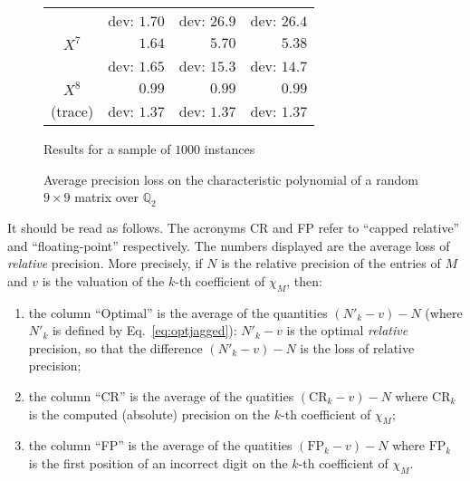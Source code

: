 \documentclass[sigconf]{acmart}
\newcommand{\Q}{\mathbb Q}
\theoremstyle{definition}
\begin{document}
\begin{figure}
{\begin{tabular}{|c|r|r|r|}
& {\scriptsize dev: $1.70$} & {\scriptsize dev: $26.9$} & {\scriptsize dev: $26.4$} \\
\rule{0pt}{2.7ex}%
$X^7$ & $1.64$ &   $5.70$           &   $5.38$ \vspace{-1.5ex} \\
& {\scriptsize dev: $1.65$} & {\scriptsize dev: $15.3$} & {\scriptsize dev: $14.7$} \\
\rule{0pt}{2.7ex}%
$X^8$ & $0.99$ &   $0.99$           &   $0.99$ \vspace{-1.5ex} \\
{\scriptsize (trace)} 
& {\scriptsize dev: $1.37$} & {\scriptsize dev: $1.37$} & {\scriptsize dev: $1.37$} \\
\hline
\end{tabular}}
\hfill\null

\medskip

\hfill
{\footnotesize Results for a sample of $1000$ instances}
\hfill\null

\caption{Average precision loss on 
the characteristic polynomial of a random $9 \times 9$
matrix over $\Q_2$}
\label{fig:exp}

\end{figure}
%
It should be read as follows. The acronyms CR and FP 
refer to ``capped relative'' and ``floating-point'' respectively.
The numbers displayed are the average loss of
\emph{relative} precision. 
More precisely, if $N$ is the relative precision of
the entries of $M$ and $v$ is the valuation of
the $k$-th coefficient of $\chi_M$, then:


\begin{enumerate}[$\bullet$]
\renewcommand{\itemsep}{0pt}
\item the column ``Optimal'' is the average of the quantities 
$(N'_k{-}v) - N$ (where $N'_k$ is defined by Eq.~\eqref{eq:optjagged}): 
$N'_k{-}v$ is the optimal \emph{relative} precision, so that the
difference $(N'_k{-}v) - N$ is the loss of relative precision;
\item the column ``CR'' is the average of the quatities 
$(\text{CR}_k{-}v) - N$ where $\text{CR}_k$ is the computed (absolute) 
precision on the $k$-th coefficient of $\chi_M$;
\item the column ``FP'' is the average of the quatities 
$(\text{FP}_k{-}v) - N$ where $\text{FP}_k$ is the first position of
an incorrect digit on the $k$-th coefficient of $\chi_M$.
\end{enumerate}
\end{document}
